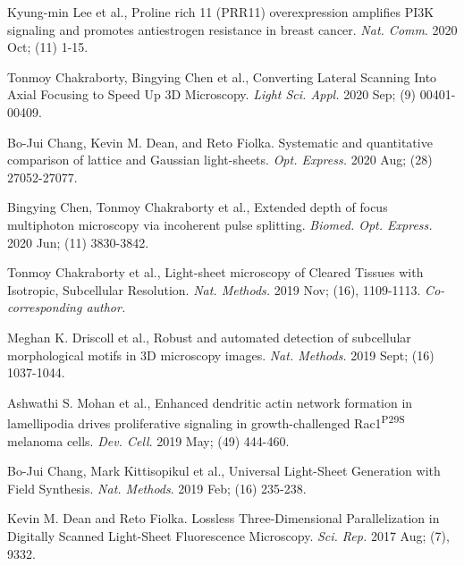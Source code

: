 \documentclass[10pt]{res}
\begin{document}
\begin{resume}
\begin{etaremune}
\item Kyung-min Lee et al., Proline rich 11 (PRR11) overexpression amplifies PI3K signaling and promotes antiestrogen resistance in breast cancer. {\it Nat. Comm}. 2020 Oct; (11) 1-15.

\item Tonmoy Chakraborty, Bingying Chen et al., Converting Lateral Scanning Into Axial Focusing to Speed Up 3D Microscopy. {\it Light Sci. Appl.} 2020 Sep; (9) 00401-00409.

\item Bo-Jui Chang, Kevin M. Dean, and Reto Fiolka.  Systematic and quantitative comparison of lattice and Gaussian light-sheets.  {\it Opt. Express.} 2020 Aug; (28) 27052-27077.

\item Bingying Chen, Tonmoy Chakraborty et al.,  Extended depth of focus multiphoton microscopy via incoherent pulse splitting. {\it Biomed. Opt. Express.} 2020 Jun; (11) 3830-3842.

\item Tonmoy Chakraborty et al., Light-sheet microscopy of Cleared Tissues with Isotropic, Subcellular Resolution. {\it Nat. Methods.} 2019 Nov; (16), 1109-1113.  {\it Co-corresponding author.}

\item Meghan K. Driscoll et al., Robust and automated detection of subcellular morphological motifs in 3D microscopy images. {\it Nat. Methods.} 2019 Sept; (16) 1037-1044.  

\item Ashwathi S. Mohan et al., Enhanced dendritic actin network formation in lamellipodia drives proliferative signaling in growth-challenged Rac1\textsuperscript{P29S} melanoma cells.  
{\it Dev. Cell}.  2019 May; (49) 444-460.

\item Bo-Jui Chang, Mark Kittisopikul et al., Universal Light-Sheet Generation with Field Synthesis. {\it Nat. Methods}. 2019  Feb; (16) 235-238. 

\item Kevin M. Dean and Reto Fiolka.  Lossless Three-Dimensional Parallelization in Digitally Scanned Light-Sheet Fluorescence Microscopy.  {\it Sci. Rep.} 2017 Aug; (7), 9332.  


\end{etaremune}
\end{resume}
\end{document}

